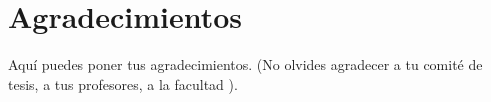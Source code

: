 
\chapter{Agradecimientos}

Aquí puedes poner tus agradecimientos. (No olvides agradecer a tu comité de tesis, a tus profesores, a la facultad ).
